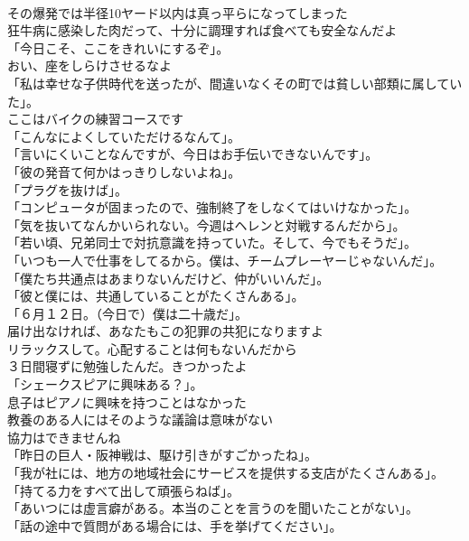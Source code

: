 \documentclass[8pt]{extreport}
\begin{document}
\begin{CJK}{UTF8}{min}
\\	その爆発では半径10ヤード以内は真っ平らになってしまった	
\\	狂牛病に感染した肉だって、十分に調理すれば食べても安全なんだよ	
\\	「今日こそ、ここをきれいにするぞ」。	
\\	おい、座をしらけさせるなよ	
\\	「私は幸せな子供時代を送ったが、間違いなくその町では貧しい部類に属していた」。	
\\	ここはバイクの練習コースです	
\\	「こんなによくしていただけるなんて」。	
\\	「言いにくいことなんですが、今日はお手伝いできないんです」。	
\\	「彼の発音て何かはっきりしないよね」。	
\\	「プラグを抜けば」。	
\\	「コンピュータが固まったので、強制終了をしなくてはいけなかった」。	
\\	「気を抜いてなんかいられない。今週はヘレンと対戦するんだから」。	
\\	「若い頃、兄弟同士で対抗意識を持っていた。そして、今でもそうだ」。	
\\	「いつも一人で仕事をしてるから。僕は、チームプレーヤーじゃないんだ」。	
\\	「僕たち共通点はあまりないんだけど、仲がいいんだ」。	
\\	「彼と僕には、共通していることがたくさんある」。	
\\	「６月１２日。（今日で）僕は二十歳だ」。	
\\	届け出なければ、あなたもこの犯罪の共犯になりますよ	
\\	リラックスして。心配することは何もないんだから	
\\	３日間寝ずに勉強したんだ。きつかったよ	
\\	「シェークスピアに興味ある？」。	
\\	息子はピアノに興味を持つことはなかった	
\\	教養のある人にはそのような議論は意味がない	
\\	協力はできませんね	
\\	「昨日の巨人・阪神戦は、駆け引きがすごかったね」。	
\\	「我が社には、地方の地域社会にサービスを提供する支店がたくさんある」。	
\\	「持てる力をすべて出して頑張らねば」。	
\\	「あいつには虚言癖がある。本当のことを言うのを聞いたことがない」。	
\\	「話の途中で質問がある場合には、手を挙げてください」。	

\end{CJK}
\end{document}
